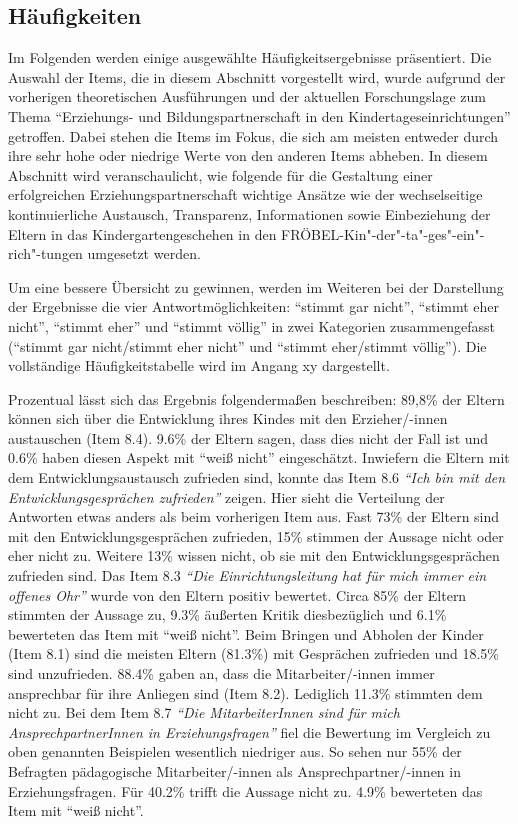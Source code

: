 \documentclass[12pt,a4paper]{article}
\begin{document}
\subsection{Häufigkeiten} 

Im Folgenden werden einige ausgewählte Häufigkeitsergebnisse präsentiert. Die Auswahl der Items, die in diesem Abschnitt vorgestellt wird, wurde aufgrund der vorherigen theoretischen Ausführungen und der aktuellen Forschungslage zum Thema "`Erziehungs- und Bildungspartnerschaft in den Kindertageseinrichtungen"' getroffen. Dabei stehen die Items im Fokus, die sich am meisten entweder durch ihre sehr hohe oder niedrige Werte von den anderen Items abheben. In diesem Abschnitt wird veranschaulicht, wie folgende für die Gestaltung einer erfolgreichen Erziehungspartnerschaft wichtige Ansätze wie der wechselseitige kontinuierliche Austausch, Transparenz, Informationen sowie Einbeziehung der Eltern in das Kindergartengeschehen in den FRÖBEL-Kin"-der"-ta"-ges"-ein"-rich"-tungen umgesetzt werden.

	Um eine bessere Übersicht zu gewinnen, werden im Weiteren bei der Darstellung der Ergebnisse die vier Antwortmöglichkeiten: "`stimmt gar nicht"', "`stimmt eher nicht"', "`stimmt eher"' und "`stimmt völlig"' in zwei Kategorien zusammengefasst ("`stimmt gar nicht/stimmt eher nicht"' und "`stimmt eher/stimmt völlig"'). Die vollständige Häufigkeitstabelle wird im Angang xy dargestellt.
	
	Prozentual lässt sich das Ergebnis folgendermaßen beschreiben: 89,8\% der Eltern können sich über die Entwicklung ihres Kindes mit den Erzieher/-innen austauschen (Item 8.4). 9.6\% der Eltern sagen, dass dies nicht der Fall ist und  0.6\% haben diesen Aspekt mit "`weiß nicht"' eingeschätzt.  Inwiefern die Eltern mit dem Entwicklungsaustausch zufrieden sind, konnte das Item 8.6 \textit{"`Ich bin mit den Entwicklungsgesprächen zufrieden"'} zeigen. Hier sieht die Verteilung der Antworten etwas anders als beim vorherigen Item aus. Fast 73\% der Eltern sind mit den Entwicklungsgesprächen zufrieden, 15\% stimmen der Aussage nicht oder eher nicht zu. Weitere 13\% wissen nicht, ob sie mit den Entwicklungsgesprächen zufrieden sind. Das Item 8.3 \textit{"`Die Einrichtungsleitung hat für mich immer ein offenes Ohr"'} wurde von den Eltern positiv bewertet. Circa 85\% der Eltern stimmten der Aussage zu, 9.3\% äußerten Kritik diesbezüglich und 6.1\% bewerteten das Item mit "`weiß nicht"'. Beim Bringen und Abholen der Kinder (Item 8.1) sind die meisten Eltern (81.3\%) mit Gesprächen zufrieden und 18.5\% sind unzufrieden. 88.4\% gaben an, dass die Mitarbeiter/-innen immer ansprechbar für ihre Anliegen sind (Item 8.2). Lediglich 11.3\% stimmten dem nicht zu. Bei dem Item 8.7 \textit{"`Die MitarbeiterInnen sind für mich AnsprechpartnerInnen in Erziehungsfragen"'} fiel die Bewertung im Vergleich zu oben genannten Beispielen wesentlich niedriger aus. So sehen nur 55\% der Befragten pädagogische Mitarbeiter/-innen als Ansprechpartner/-innen in Erziehungsfragen. Für 40.2\% trifft die Aussage nicht zu. 4.9\% bewerteten das Item mit "`weiß nicht"'.
	
\end{document}
